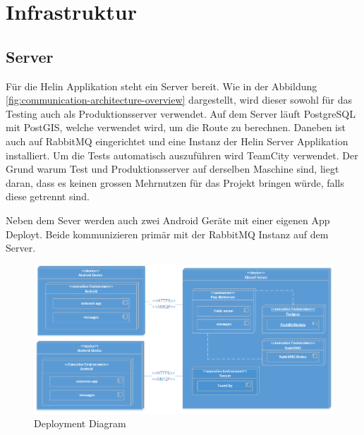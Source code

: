 \newpage

\chapter{Infrastruktur}

\section{Server}

Für die Helin Applikation steht ein Server bereit. Wie in der Abbildung \ref{fig:communication-architecture-overview} dargestellt, wird dieser sowohl für das Testing auch als Produktionsserver verwendet. 
Auf dem Server läuft PostgreSQL mit PostGIS, welche verwendet wird, um die Route zu berechnen. Daneben ist auch auf RabbitMQ eingerichtet und eine Instanz der Helin Server Applikation installiert. 
Um die Tests automatisch auszuführen wird TeamCity verwendet. Der Grund warum Test und Produktionsserver auf derselben Maschine sind, liegt daran, dass es keinen grossen Mehrnutzen für das Projekt bringen würde, falls diese getrennt sind.

Neben dem Sever werden auch zwei Android Geräte mit einer eigenen App Deployt. Beide kommunizieren primär mit der RabbitMQ Instanz auf dem Server.


\begin{figure}[h]
	\includegraphics[width=1.0\textwidth]{images/DeploymentDiagram.png}
	\caption{Deployment Diagram}
	\label{fig:deployment-diagram}
\end{figure}


